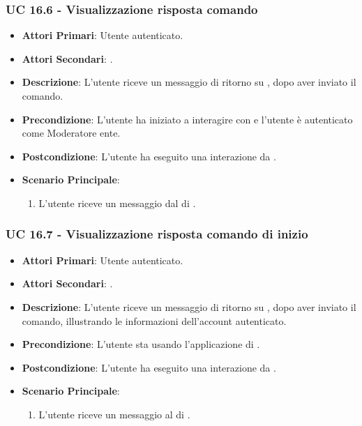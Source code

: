 
	\subsubsection{UC 16.6 - Visualizzazione risposta comando }

	\begin{itemize}
		\item \textbf{Attori Primari}: Utente autenticato.
		\item \textbf{Attori Secondari}: .
		\item \textbf{Descrizione}: L'utente riceve un messaggio di ritorno su , dopo aver inviato il comando.
		\item \textbf{Precondizione}: L'utente ha iniziato a interagire con  e l'utente è autenticato come Moderatore ente.
		\item \textbf{Postcondizione}:  L'utente ha eseguito una interazione da .
		\item \textbf{Scenario Principale}:
		\begin{enumerate}
			\item L'utente riceve un messaggio dal  di .
		\end{enumerate}
	\end{itemize}

	\subsubsection{UC 16.7 - Visualizzazione risposta comando di inizio }

	\begin{itemize}
			\item \textbf{Attori Primari}: Utente autenticato.
			\item \textbf{Attori Secondari}: .
			\item \textbf{Descrizione}: L'utente riceve un messaggio di ritorno su , dopo aver inviato il comando, illustrando le informazioni dell'account autenticato.
			\item \textbf{Precondizione}: L'utente sta usando l'applicazione di .
			\item \textbf{Postcondizione}: L'utente ha eseguito una interazione da .
			\item \textbf{Scenario Principale}:
			\begin{enumerate}
				\item L'utente riceve un messaggio al  di .
			\end{enumerate}
		\end{itemize}

